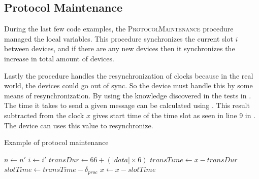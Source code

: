 \subsection{Protocol Maintenance}\label{subsec:protocolmaintanaince}
During the last few code examples, the \textsc{ProtocolMaintenance} procedure managed the local variables. 
This procedure synchronizes the current slot $i$ between devices, and if there are any new devices then it synchronizes the increase in total amount of devices.

Lastly the procedure handles the resynchronization of clocks because in the real world, the devices could go out of sync. 
So the  device must handle this by some means of resynchronization. 
By using the knowledge discovered in the tests in . 
The time it takes to send a given message can be calculated using . 
This result subtracted from the clock $x$ gives start time of the time slot as seen in line 9 in . 
The device can uses this value to resynchronize.

\begin{algorithm}[h]
\caption{Example of protocol maintenance}
\label{lst:maintaniance}
\begin{algorithmic}[1]
        \State $n \gets n'$
    \EndIf
    \State $i \gets i'$
    \State $transDur \gets 66 + (|data| \times 6)$ 
    \State $transTime \gets x - transDur$ 
    \State $slotTime \gets transTime - \delta_{proc}$ 
    \State $x \gets x - slotTime$         
\EndProcedure        
\end{algorithmic}    
\end{algorithm} 
